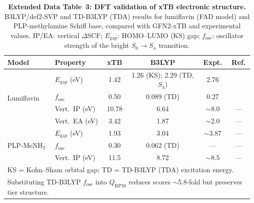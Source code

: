 \documentclass[11pt]{article}
\begin{document}
\begin{table}[p]
\centering
\caption{\textbf{Extended Data Table~3: DFT validation of xTB electronic structure.} B3LYP/def2-SVP and TD-B3LYP (TDA) results for lumiflavin (FAD model) and PLP-methylamine Schiff base, compared with GFN2-xTB and experimental values. IP/EA: vertical $\Delta$SCF; $E_\mathrm{gap}$: HOMO--LUMO (KS) gap; $f_\mathrm{osc}$: oscillator strength of the bright $S_0 \to S_n$ transition.}
\label{tab:ext_dft}
\small
\begin{tabular}{@{}llcccc@{}}
\toprule
Model & Property & xTB & B3LYP & Expt. & Ref. \\
\midrule
\multirow{4}{*}{Lumiflavin} & $E_\mathrm{gap}$ (eV)    & 1.42 & 1.26 (KS); 2.29 (TD, $S_4$) & 2.76 & \cite{Islam2003} \\
 & $f_\mathrm{osc}$           & 0.50 & 0.089 (TD)          & 0.27  & \cite{Islam2003} \\
 & Vert.\ IP (eV)           & 10.78 & 6.64                & $\sim$8.0 & --- \\
 & Vert.\ EA (eV)           & 3.42 & 1.87                & $\sim$2.0 & --- \\
\midrule
\multirow{3}{*}{PLP-MeNH$_2$} & $E_\mathrm{gap}$ (eV)  & 1.93 & 3.04                & $\sim$3.87 & --- \\
 & $f_\mathrm{osc}$           & 0.30 & 0.062 (TD)          & --- & --- \\
 & Vert.\ IP (eV)           & 11.5 & 8.72                & $\sim$8.5 & --- \\
\bottomrule
\multicolumn{6}{l}{\footnotesize KS = Kohn--Sham orbital gap; TD = TD-B3LYP (TDA) excitation energy.} \\
\multicolumn{6}{l}{\footnotesize Substituting TD-B3LYP $f_\mathrm{osc}$ into $Q_\mathrm{RPM}$ reduces scores $\sim$5.8-fold but preserves tier structure.}
\end{tabular}
\end{table}
\end{document}
